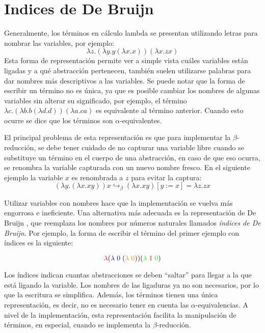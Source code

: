 \section{Indices de De Bruijn}
Generalmente, los términos en cálculo lambda se presentan utilizando letras para nombrar las variables, por ejemplo:
\[ \lambda z. (\lambda y. y (\lambda x. x)) (\lambda x. z x) \]
Esta forma de representación permite ver a simple vista cuáles variables están ligadas y a qué abstracción pertenecen, también suelen utilizarse palabras para dar nombres más descriptivos a las variables.
Se puede notar que la forma de escribir un término no es única, ya que es posible cambiar los nombres de algunas variables sin alterar su significado, por ejemplo, el término $\lambda c. (\lambda b. b (\lambda d. d)) (\lambda a. c a)$ es equivalente al término anterior.
Cuando esto ocurre se dice que los términos son $\alpha$-equivalentes.

El principal problema de esta representación es que para implementar la $\beta$-reducción, se debe tener cuidado de no capturar una variable libre cuando se substituye un término en el cuerpo de una abstracción, en caso de que eso ocurra, se renombra la variable capturada con un nuevo nombre fresco.
En el siguiente ejemplo la variable $x$ es renombrada a $z$ para evitar la captura:
\[ (\lambda y. (\lambda x. x y)) x \hookrightarrow_{\beta} (\lambda x. x y)[y := x] = \lambda z. z x \]

Utilizar variables con nombres hace que la implementación se vuelva más engorrosa e ineficiente.
Una alternativa más adecuada es la representación de De Bruijn \cite{debrujin_index}, que reemplaza los nombres por números naturales llamados \textit{índices de De Bruijn}.
Por ejemplo, la forma de escribir el término del primer ejemplo con índices es la siguiente:

\[ \textcolor{red}{\lambda} (\textcolor{blue}{\lambda\; 0} \; (\textcolor{orange}{\lambda\; 0})) (\textcolor{green}{\lambda}\; \textcolor{red}{1} \; \textcolor{green}{0}) \]

Los índices indican cuantas abstracciones se deben ``saltar'' para llegar a la que está ligando la variable.
Los nombres de las ligaduras ya no son necesarios, por lo que la escritura se simplifica.
Además, los términos tienen una única representación, es decir, no es necesario tener en cuenta las $\alpha$-equivalencias.
A nivel de la implementación, esta representación facilita la manipulación de términos, en especial, cuando se implementa la $\beta$-reducción.

